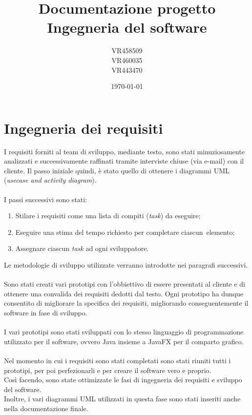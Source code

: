 \documentclass[a4paper,11pt]{article}
\newcommand{\SP}{\mbox{ }}
\begin{document}
\title{Documentazione progetto Ingegneria del software}
\author{VR458509\\VR460035\\VR443470}
\date{\printdayoff\today}	%
\maketitle

\newpage

\tableofcontents	%
	
\newpage
\section{Ingegneria dei requisiti}
\label{pri:ing_req}
I requisiti forniti al team di sviluppo, mediante testo, sono stati minuziosamente analizzati e successivamente raffinati tramite interviste chiuse (via e-mail) con il cliente. Il passo iniziale quindi, è stato quello di ottenere i diagrammi UML (\emph{usecase and activity diagram}).\\
\\
I passi successivi sono stati:
\begin{enumerate}
	\item Stilare i requisiti come una lista di compiti (\emph{task}) da eseguire;
	\item Eseguire una stima del tempo richiesto per completare ciascun\SP elemento;
	\item Assegnare ciascun \emph{task} ad ogni sviluppatore.
\end{enumerate}
Le metodologie di sviluppo utilizzate verranno introdotte nei paragrafi successivi.\\
\\
Sono stati creati vari prototipi con l'obbiettivo di essere presentati al cliente e di ottenere una convalida dei requisiti dedotti dal testo. Ogni prototipo ha dunque consentito di migliorare la specifica dei requisiti, migliorando conseguentemente il software in fase di sviluppo.\\
\\
I vari prototipi sono stati sviluppati con lo stesso linguaggio di programmazione utilizzato per il software, ovvero Java insieme a JavaFX per il comparto grafico.\\
\\
Nel momento in cui i requisiti sono stati completati sono stati riuniti tutti i prototipi, per poi perfezionarli e per creare il software vero e proprio.\\
Così facendo, sono state ottimizzate le fasi di ingegneria dei requisiti e sviluppo del software.\\
Inoltre, i vari diagrammi UML utilizzati in questa fase sono stati inseriti anche nella documentazione finale.
\\
\end{document}
